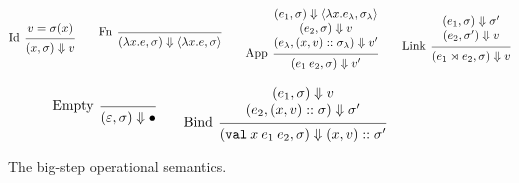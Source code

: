 \documentclass{article}
\theoremstyle{definition}
\newcommand*{\cons}{::}
\newcommand*{\ctx}{\sigma}
\newcommand*{\semarrow}{\Downarrow}
\newcommand*{\link}[2]{{#1}\rtimes{#2}}
\newcommand*{\Lete}{\mathtt{val}}
\begin{document}
\begin{figure}[h!]
  \footnotesize
  \begin{flushright}
    \fbox{$(e,\ctx)\semarrow v$}
  \end{flushright}
  \centering
  \vspace{0pt} %
  \[
    \begin{prooftree}
      \hypo{v=\ctx(x)}
      \infer[left label=Id]1{
      (x, \ctx)
      \semarrow
      v
      }
    \end{prooftree}\qquad
    \begin{prooftree}
      \infer[left label=Fn]0{
      (\lambda x.e, \ctx)
      \semarrow
      \langle\lambda x.e, \ctx\rangle
      }
    \end{prooftree}\qquad
    \begin{prooftree}
      \hypo{
        \begin{matrix}
          (e_{1}, \ctx)
          \semarrow
          \langle\lambda x.e_{\lambda}, \ctx_{\lambda}\rangle \\
          (e_{2}, \ctx)
          \semarrow
          v                                                   \\
          (e_{\lambda}, (x, v)\cons \ctx_{\lambda})
          \semarrow
          v'
        \end{matrix}
      }
      \infer[left label={App}]1{
      (e_{1}\:e_{2}, \ctx)
      \semarrow
      v'
      }
    \end{prooftree}\qquad
    \begin{prooftree}
      \hypo{
        \begin{matrix}
          (e_{1}, \ctx)
          \semarrow
          \ctx' \\
          (e_{2}, \ctx')
          \semarrow
          v
        \end{matrix}
      }
      \infer[left label=Link]1{
      (\link{e_{1}}{e_{2}}, \ctx)
      \semarrow
      v
      }
    \end{prooftree}
  \]

  \[
    \begin{prooftree}
      \infer[left label=Empty]0{
      (\varepsilon, \ctx)
      \semarrow
      \bullet
      }
    \end{prooftree}\qquad
    \begin{prooftree}
      \hypo{
        \begin{matrix}
          (e_{1}, \ctx)
          \semarrow
          v \\
          (e_{2}, (x, v)\cons \ctx)
          \semarrow
          \ctx'
        \end{matrix}
      }
      \infer[left label=Bind]1{
      (\Lete\:x\:e_1\:e_2, \ctx)
      \semarrow
      (x,v)\cons\ctx'
      }
    \end{prooftree}
  \]
  \caption{The big-step operational semantics.}
  \label{fig:extsimpreach}
\end{figure}
\end{document}
